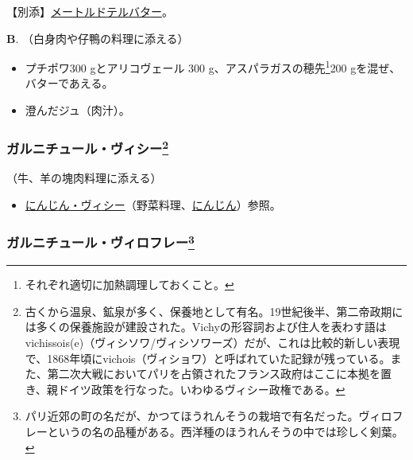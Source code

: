 \begin{recette}
【別添】\protect\hyperlink{beurre-maitre-d-hotel}{メートルドテルバター}。

\textbf{B}. （白身肉や仔鴨の料理に添える）

\begin{itemize}
\item
  プチポワ300 gとアリコヴェール 300 g、アスパラガスの穂先\footnote{それぞれ適切に加熱調理しておくこと。}200
  gを混ぜ、バターであえる。
\item
  澄んだジュ（肉汁）。
\end{itemize}

\atoaki{}

\hypertarget{garniture-vichy}{%
\subsubsection[ガルニチュール・ヴィシー]{\texorpdfstring{ガルニチュール・ヴィシー\footnote{古くから温泉、鉱泉が多く、保養地として有名。19世紀後半、第二帝政期には多くの保養施設が建設された。Vichyの形容詞および住人を表わす語は
  vichissois(e)（ヴィシソワ/ヴィシソワーズ）だが、これは比較的新しい表現で、1868年頃にvichois（ヴィショワ）と呼ばれていた記録が残っている。また、第二次大戦においてパリを占領されたフランス政府はここに本拠を置き、親ドイツ政策を行なった。いわゆるヴィシー政権である。}}{ガルニチュール・ヴィシー}}\label{garniture-vichy}}



（牛、羊の塊肉料理に添える）

\begin{itemize}
\tightlist
\item
  \protect\hyperlink{carottes-vichy}{にんじん・ヴィシー}（野菜料理、\protect\hyperlink{carottes}{にんじん}）参照。
\end{itemize}

\atoaki{}

\hypertarget{garniture-viroflay}{%
\subsubsection[ガルニチュール・ヴィロフレー]{\texorpdfstring{ガルニチュール・ヴィロフレー\footnote{パリ近郊の町の名だが、かつてほうれんそうの栽培で有名だった。ヴィロフレーというの名の品種がある。西洋種のほうれんそうの中では珍しく剣葉。}}{ガルニチュール・ヴィロフレー}}\label{garniture-viroflay}}


\end{recette}
